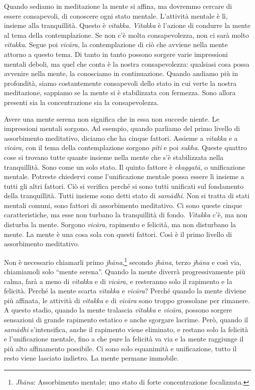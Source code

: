 Quando sediamo in meditazione la mente si affina, ma dovremmo cercare di
essere consapevoli, di conoscere ogni stato mentale. L'attività mentale
è lì, insieme alla tranquillità. Questo è \emph{vitakka}. \emph{Vitakka}
è l'azione di condurre la mente al tema della contemplazione. Se non c'è
molta consapevolezza, non ci sarà molto \emph{vitakka}. Segue poi
\emph{vicāra}, la contemplazione di ciò che avviene nella mente attorno
a questo tema. Di tanto in tanto possono sorgere varie impressioni
mentali deboli, ma quel che conta è la nostra consapevolezza: qualsiasi
cosa possa avvenire nella mente, la conosciamo in continuazione. Quando
andiamo più in profondità, siamo costantemente consapevoli dello stato
in cui verte la nostra meditazione, sappiamo se la mente si è
stabilizzata con fermezza. Sono allora presenti sia la concentrazione
sia la consapevolezza.

Avere una mente serena non significa che in essa non succede niente. Le
impressioni mentali sorgono. Ad esempio, quando parliamo del primo
livello di assorbimento meditativo, diciamo che ha cinque fattori.
Assieme a \emph{vitakka} e a \emph{vicāra}, con il tema della
contemplazione sorgono \emph{pīti} e poi \emph{sukha}. Queste quattro
cose si trovano tutte quante insieme nella mente che s'è stabilizzata
nella tranquillità. Sono come un solo stato. Il quinto fattore è
\emph{ekaggatā}, o unificazione mentale. Potreste chiedervi come
l'unificazione mentale possa essere lì insieme a tutti gli altri
fattori. Ciò si verifica perché si sono tutti unificati sul fondamento
della tranquillità. Tutti insieme sono detti stato di \emph{samādhi}.
Non si tratta di stati mentali comuni, sono fattori di assorbimento
meditativo. Ci sono queste cinque caratteristiche, ma esse non turbano
la tranquillità di fondo. \emph{Vitakka} c'è, ma non disturba la mente.
Sorgono \emph{vicāra}, rapimento e felicità, ma non disturbano la mente.
La mente è una cosa sola con questi fattori. Così è il primo livello di
assorbimento meditativo.

Non è necessario chiamarli primo \emph{jhāna},\footnote{\emph{Jhāna}:
  Assorbimento mentale; uno stato di forte concentrazione focalizzata.}
secondo \emph{jhāna}, terzo \emph{jhāna} e così via, chiamiamoli solo
``mente serena''. Quando la mente diverrà progressivamente più calma,
farà a meno di \emph{vitakka} e di \emph{vicāra}, e resteranno solo il
rapimento e la felicità. Perché la mente scarta \emph{vitakka} e
\emph{vicāra}? Perché quando la mente diviene più affinata, le attività
di \emph{vitakka} e di \emph{vicāra} sono troppo grossolane per
rimanere. A questo stadio, quando la mente tralascia \emph{vitakka} e
\emph{vicāra}, possono sorgere sensazioni di grande rapimento estatico e
anche sgorgare lacrime. Però, quando il \emph{samādhi} s'intensifica,
anche il rapimento viene eliminato, e restano solo la felicità e
l'unificazione mentale, fino a che pure la felicità va via e la mente
raggiunge il più alto affinamento possibile. Ci sono solo equanimità e
unificazione, tutto il resto viene lasciato indietro. La mente permane
immobile.


